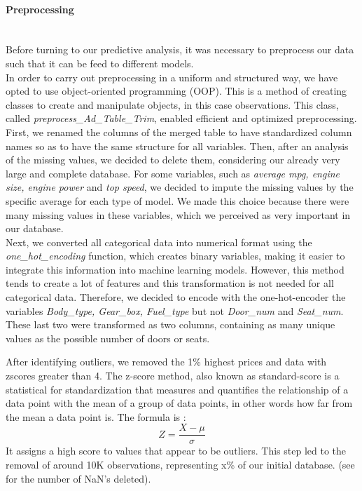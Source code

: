 \documentclass[12pt]{article}
\begin{document}
\paragraph{Preprocessing} 
~~\\
\noindent Before turning to our predictive analysis, it was necessary to preprocess our data such that it can be feed to different models.\\

\noindent In order to carry out preprocessing in a uniform and structured way, we have opted to use object-oriented programming (OOP). This is a method of creating classes to create and manipulate objects, in this case observations. This class, called \textit{preprocess\_Ad\_Table\_Trim}, enabled efficient and optimized preprocessing. First, we renamed the columns of the merged table to have standardized column names so as to have the same structure for all variables. Then, after an analysis of the missing values, we decided to delete them, considering our already very large and complete database. For some variables, such as \textit{average mpg, engine size, engine power} and \textit{top speed}, we decided to impute the missing values by the specific average for each type of model. We made this choice because there were many missing values in these variables, which we perceived as very important in our database. \\

\noindent Next, we converted all categorical data into numerical format using the \textit{one\_hot\_encoding} function, which creates binary variables, making it easier to integrate this information into machine learning models. However, this method tends to create a lot of features and this transformation is not needed for all categorical data. Therefore, we decided to encode with the one-hot-encoder the variables \textit{Body\_type, Gear\_box, Fuel\_type} but not \textit{Door\_num} and \textit{Seat\_num}. These last two were transformed as two columns, containing as many unique values as the possible number of doors or seats.

\noindent After identifying outliers, we removed the 1\% highest prices and data with zscores greater than 4. The z-score method, also known as standard-score is a statistical for standardization that measures and quantifies the relationship of a data point with the mean of a group of data points, in other words how far from the mean a data point is. The formula is : \[Z = \frac{{X - \mu}}{{\sigma}}\] It assigns a high score to values that appear to be outliers. This step led to the removal of around 10K observations, representing x\% of our initial database. (see for the number of NaN's deleted).\\
\end{document}
